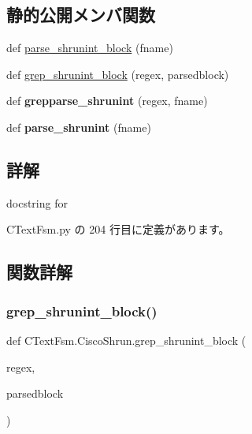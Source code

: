 \subsection*{静的公開メンバ関数}
\begin{DoxyCompactItemize}
\item 
def \mbox{\hyperlink{classCTextFsm_1_1CiscoShrun_ac2f526f3a7fab20d62f72ebf254cd294}{parse\+\_\+shrunint\+\_\+block}} (fname)
\item 
def \mbox{\hyperlink{classCTextFsm_1_1CiscoShrun_ab1d78a9f40047c40bf376424dc80e1b0}{grep\+\_\+shrunint\+\_\+block}} (regex, parsedblock)
\item 
\mbox{\label{classCTextFsm_1_1CiscoShrun_a3761210be7d022180e7c7c547450da8c}} 
def {\bfseries grepparse\+\_\+shrunint} (regex, fname)
\item 
\mbox{\label{classCTextFsm_1_1CiscoShrun_a68c34689ebfe08612fba9819d52ce27c}} 
def {\bfseries parse\+\_\+shrunint} (fname)
\end{DoxyCompactItemize}


\subsection{詳解}
\begin{DoxyVerb}docstring for \end{DoxyVerb}
 

 C\+Text\+Fsm.\+py の 204 行目に定義があります。



\subsection{関数詳解}
\mbox{\label{classCTextFsm_1_1CiscoShrun_ab1d78a9f40047c40bf376424dc80e1b0}} 
\subsubsection{\texorpdfstring{grep\_shrunint\_block()}{grep\_shrunint\_block()}}
{\footnotesize\ttfamily def C\+Text\+Fsm.\+Cisco\+Shrun.\+grep\+\_\+shrunint\+\_\+block (\begin{DoxyParamCaption}\item[{}]{regex,  }\item[{}]{parsedblock }\end{DoxyParamCaption})\hspace{0.3cm}{\ttfamily [static]}}

